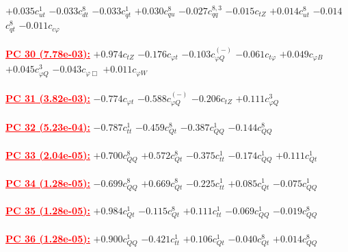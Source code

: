 \documentclass{article}
\begin{document}
{$+0.035$}{\rm $c_{ut}^{1}$} 
{$-0.033$}{\rm $c_{dt}^{8}$} 
{$-0.033$}{\rm $c_{qt}^{1}$} 
{$+0.030$}{\rm $c_{qu}^{8}$} 
{$-0.027$}{\rm $c_{qq}^{8,3}$} 
{$-0.015$}{\rm $c_{tZ}$} 
{$+0.014$}{\rm $c_{ut}^{8}$} 
{$-0.014$}{\rm $c_{qt}^{8}$} 
{$-0.011$}{\rm $c_{c \varphi}$} 
 \nonumber \\ \nonumber \\ 
\noindent \textcolor{red}{\underline{\bf{PC 30} (7.78e-03):}}
{$+0.974$}{\rm $c_{tZ}$} 
{$-0.176$}{\rm $c_{\varphi t}$} 
{$-0.103$}{\rm $c_{\varphi Q}^{(-)}$} 
{$-0.061$}{\rm $c_{t \varphi}$} 
{$+0.049$}{\rm $c_{\varphi B}$} 
{$+0.045$}{\rm $c_{\varphi Q}^{3}$} 
{$-0.043$}{\rm $c_{\varphi \Box}$} 
{$+0.011$}{\rm $c_{\varphi W}$} 
 \nonumber \\ \nonumber \\ 
\noindent \textcolor{red}{\underline{\bf{PC 31} (3.82e-03):}}
{$-0.774$}{\rm $c_{\varphi t}$} 
{$-0.588$}{\rm $c_{\varphi Q}^{(-)}$} 
{$-0.206$}{\rm $c_{tZ}$} 
{$+0.111$}{\rm $c_{\varphi Q}^{3}$} 
 \nonumber \\ \nonumber \\ 
\noindent \textcolor{red}{\underline{\bf{PC 32} (5.23e-04):}}
{$-0.787$}{\rm $c_{tt}^{1}$} 
{$-0.459$}{\rm $c_{Qt}^{8}$} 
{$-0.387$}{\rm $c_{QQ}^{1}$} 
{$-0.144$}{\rm $c_{QQ}^{8}$} 
 \nonumber \\ \nonumber \\ 
\noindent \textcolor{red}{\underline{\bf{PC 33} (2.04e-05):}}
{$+0.700$}{\rm $c_{QQ}^{8}$} 
{$+0.572$}{\rm $c_{Qt}^{8}$} 
{$-0.375$}{\rm $c_{tt}^{1}$} 
{$-0.174$}{\rm $c_{QQ}^{1}$} 
{$+0.111$}{\rm $c_{Qt}^{1}$} 
 \nonumber \\ \nonumber \\ 
\noindent \textcolor{red}{\underline{\bf{PC 34} (1.28e-05):}}
{$-0.699$}{\rm $c_{QQ}^{8}$} 
{$+0.669$}{\rm $c_{Qt}^{8}$} 
{$-0.225$}{\rm $c_{tt}^{1}$} 
{$+0.085$}{\rm $c_{Qt}^{1}$} 
{$-0.075$}{\rm $c_{QQ}^{1}$} 
 \nonumber \\ \nonumber \\ 
\noindent \textcolor{red}{\underline{\bf{PC 35} (1.28e-05):}}
{$+0.984$}{\rm $c_{Qt}^{1}$} 
{$-0.115$}{\rm $c_{Qt}^{8}$} 
{$+0.111$}{\rm $c_{tt}^{1}$} 
{$-0.069$}{\rm $c_{QQ}^{1}$} 
{$-0.019$}{\rm $c_{QQ}^{8}$} 
 \nonumber \\ \nonumber \\ 
\noindent \textcolor{red}{\underline{\bf{PC 36} (1.28e-05):}}
{$+0.900$}{\rm $c_{QQ}^{1}$} 
{$-0.421$}{\rm $c_{tt}^{1}$} 
{$+0.106$}{\rm $c_{Qt}^{1}$} 
{$-0.040$}{\rm $c_{Qt}^{8}$} 
{$+0.014$}{\rm $c_{QQ}^{8}$} 
 \nonumber \\ \nonumber \\ 
\end{document}
